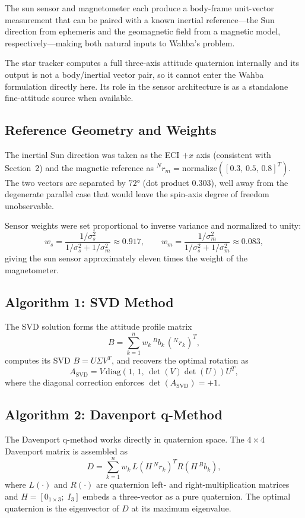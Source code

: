\documentclass[12pt]{article}
\begin{document}
The sun sensor and magnetometer each produce a body-frame unit-vector measurement that can be paired with a known inertial reference—the Sun direction from ephemeris and the geomagnetic field from a magnetic model, respectively—making both natural inputs to Wahba's problem.

The star tracker computes a full three-axis attitude quaternion internally and its output is not a body/inertial vector pair, so it cannot enter the Wahba formulation directly here. Its role in the sensor architecture is as a standalone fine-attitude source when available.

\subsection{Reference Geometry and Weights}

The inertial Sun direction was taken as the ECI $+x$ axis (consistent with Section~2) and the magnetic reference as ${}^N r_m = \mathrm{normalize}([0.3,\,0.5,\,0.8]^T)$. The two vectors are separated by $72°$ (dot product $0.303$), well away from the degenerate parallel case that would leave the spin-axis degree of freedom unobservable.

Sensor weights were set proportional to inverse variance and normalized to unity:
\[
w_s = \frac{1/\sigma_s^2}{1/\sigma_s^2 + 1/\sigma_m^2} \approx 0.917,
\qquad
w_m = \frac{1/\sigma_m^2}{1/\sigma_s^2 + 1/\sigma_m^2} \approx 0.083,
\]
giving the sun sensor approximately eleven times the weight of the magnetometer.

\subsection{Algorithm 1: SVD Method}

The SVD solution \cite{Markley1988} forms the attitude profile matrix
\[
B = \sum_{k=1}^{n} w_k\, {}^B b_k\, ({}^N r_k)^T,
\]
computes its SVD $B = U\Sigma V^T$, and recovers the optimal rotation as
\[
A_{\text{SVD}}
= V \,\mathrm{diag}\!\left(1,\,1,\,\det(V)\det(U)\right) U^T,
\]
where the diagonal correction enforces $\det(A_{\text{SVD}}) = +1$.

\subsection{Algorithm 2: Davenport q-Method}

The Davenport q-method \cite{Davenport1968} works directly in quaternion space. The $4 \times 4$ Davenport matrix is assembled as
\[
D = \sum_{k=1}^{n} w_k\, L(H\, {}^N r_k)^T R(H\, {}^B b_k),
\]
where $L(\cdot)$ and $R(\cdot)$ are quaternion left- and right-multiplication matrices and $H = [0_{1\times3};\; I_3]$ embeds a three-vector as a pure quaternion. The optimal quaternion is the eigenvector of $D$ at its maximum eigenvalue.
\end{document}
